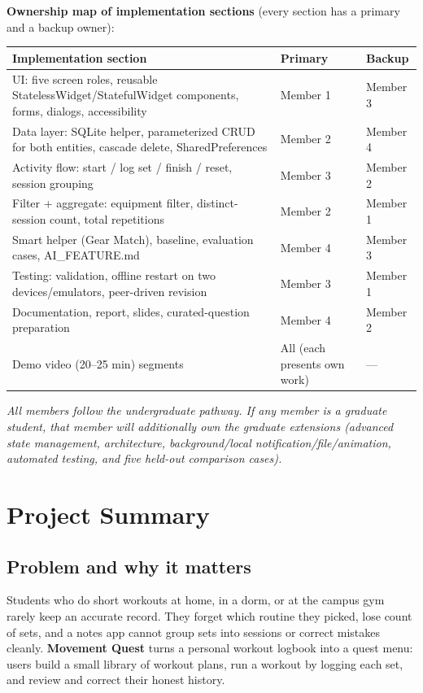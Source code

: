 \documentclass[11pt]{article}
\begin{document}
\medskip
{}
\noindent\textbf{Ownership map of implementation sections} (every section has a primary and a backup owner):

\begin{tabularx}{\textwidth}{@{}L l l@{}}
\toprule
\textbf{Implementation section} & \textbf{Primary} & \textbf{Backup} \\
\midrule
UI: five screen roles, reusable StatelessWidget/StatefulWidget components, forms, dialogs, accessibility & Member 1 & Member 3 \\
Data layer: SQLite helper, parameterized CRUD for both entities, cascade delete, SharedPreferences & Member 2 & Member 4 \\
Activity flow: start / log set / finish / reset, session grouping & Member 3 & Member 2 \\
Filter + aggregate: equipment filter, distinct-session count, total repetitions & Member 2 & Member 1 \\
Smart helper (Gear Match), baseline, evaluation cases, AI\_FEATURE.md & Member 4 & Member 3 \\
Testing: validation, offline restart on two devices/emulators, peer-driven revision & Member 3 & Member 1 \\
Documentation, report, slides, curated-question preparation & Member 4 & Member 2 \\
Demo video (20--25 min) segments & All (each presents own work) & --- \\
\bottomrule
\end{tabularx}

\smallskip
\noindent\textit{All members follow the undergraduate pathway. If any member is a graduate student, that member will additionally own the graduate extensions (advanced state management, architecture, background/local notification/file/animation, automated testing, and five held-out comparison cases).}

\section{Project Summary}

\subsection*{Problem and why it matters}
Students who do short workouts at home, in a dorm, or at the campus gym rarely keep an accurate record. They forget which routine they picked, lose count of sets, and a notes app cannot group sets into sessions or correct mistakes cleanly. \textbf{Movement Quest} turns a personal workout logbook into a quest menu: users build a small library of workout plans, run a workout by logging each set, and review and correct their honest history.
\end{document}
